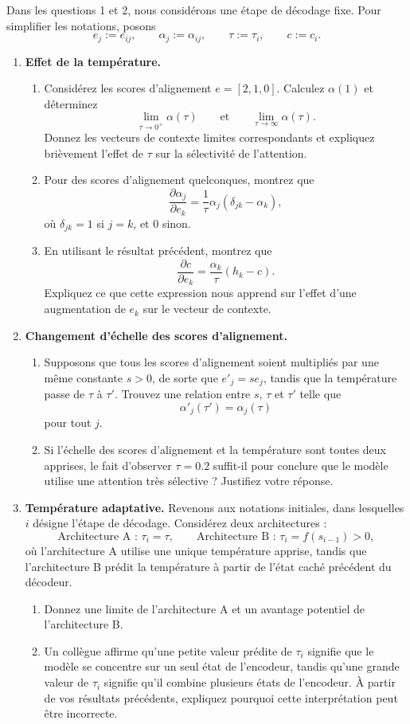 \documentclass[12pt]{article}
\theoremstyle{definition}
\begin{document}
Dans les questions 1 et 2, nous considérons une étape de décodage fixe. Pour simplifier les notations, posons
\[
e_j:=e_{ij},\qquad\alpha_j:=\alpha_{ij},\qquad\tau:=\tau_i,\qquad c:=c_i.
\]
\begin{enumerate}
\item \textbf{Effet de la température.}
\begin{enumerate}[label=(\alph*),leftmargin=16pt]
\item Considérez les scores d'alignement $e=[2,1,0]$. Calculez $\alpha(1)$ et déterminez
\[\lim_{\tau\to0^+}\alpha(\tau)\qquad\text{et}\qquad\lim_{\tau\to\infty}\alpha(\tau).\]
Donnez les vecteurs de contexte limites correspondants et expliquez brièvement l'effet de $\tau$ sur la sélectivité de l'attention.
\item Pour des scores d'alignement quelconques, montrez que
\[\frac{\partial\alpha_j}{\partial e_k}=\frac{1}{\tau}\alpha_j(\delta_{jk}-\alpha_k),\]
où $\delta_{jk}=1$ si $j=k$, et $0$ sinon.
\item En utilisant le résultat précédent, montrez que
\[\frac{\partial c}{\partial e_k}=\frac{\alpha_k}{\tau}(h_k-c).\]
Expliquez ce que cette expression nous apprend sur l'effet d'une augmentation de $e_k$ sur le vecteur de contexte.
\end{enumerate}
\item \textbf{Changement d'échelle des scores d'alignement.}
\begin{enumerate}[label=(\alph*),leftmargin=16pt]
\item Supposons que tous les scores d'alignement soient multipliés par une même constante $s>0$, de sorte que $e'_j=se_j$, tandis que la température passe de $\tau$ à $\tau'$. Trouvez une relation entre $s$, $\tau$ et $\tau'$ telle que
\[\alpha'_j(\tau')=\alpha_j(\tau)\]
pour tout $j$.
\item Si l'échelle des scores d'alignement et la température sont toutes deux apprises, le fait d'observer $\tau=0.2$ suffit-il pour conclure que le modèle utilise une attention très sélective ? Justifiez votre réponse.
\end{enumerate}
\item \textbf{Température adaptative.} Revenons aux notations initiales, dans lesquelles $i$ désigne l'étape de décodage. Considérez deux architectures :
\[\text{Architecture A : }\tau_i=\tau,\qquad\text{Architecture B : }\tau_i=f(s_{i-1})>0,\]
où l'architecture A utilise une unique température apprise, tandis que l'architecture B prédit la température à partir de l'état caché précédent du décodeur.
\begin{enumerate}[label=(\alph*),leftmargin=16pt]
\item Donnez une limite de l'architecture A et un avantage potentiel de l'architecture B.
\item Un collègue affirme qu'une petite valeur prédite de $\tau_i$ signifie que le modèle se concentre sur un seul état de l'encodeur, tandis qu'une grande valeur de $\tau_i$ signifie qu'il combine plusieurs états de l'encodeur. À partir de vos résultats précédents, expliquez pourquoi cette interprétation peut être incorrecte.
\end{enumerate}
\end{enumerate}
\end{document}
